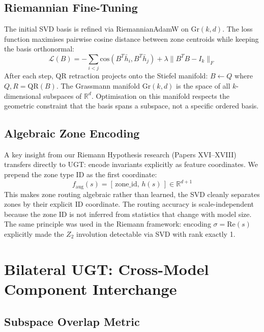 \documentclass[11pt]{article}
\begin{document}
\subsection{Riemannian Fine-Tuning}

The initial SVD basis is refined via RiemannianAdamW on $\mathrm{Gr}(k,d)$. The loss function maximises pairwise cosine distance between zone centroids while keeping the basis orthonormal:
\begin{equation}
\mathcal{L}(B) = -\sum_{i < j} \mathrm{cos}(B^T \bar{h}_i, B^T \bar{h}_j) + \lambda \|B^T B - I_k\|_F
\end{equation}
After each step, QR retraction projects onto the Stiefel manifold: $B \leftarrow Q$ where $Q,R = \mathrm{QR}(B)$. The Grassmann manifold $\mathrm{Gr}(k,d)$ is the space of all $k$-dimensional subspaces of $\mathbb{R}^d$. Optimisation on this manifold respects the geometric constraint that the basis spans a subspace, not a specific ordered basis.

\subsection{Algebraic Zone Encoding}

A key insight from our Riemann Hypothesis research (Papers XVI--XVIII) transfers directly to UGT: encode invariants explicitly as feature coordinates. We prepend the zone type ID as the first coordinate:
\begin{equation}
f_{\mathrm{aug}}(s) = [\, \mathrm{zone\_id},\, h(s) \,] \in \mathbb{R}^{d+1}
\end{equation}
This makes zone routing algebraic rather than learned, the SVD cleanly separates zones by their explicit ID coordinate. The routing accuracy is scale-independent because the zone ID is not inferred from statistics that change with model size. The same principle was used in the Riemann framework: encoding $\sigma = \mathrm{Re}(s)$ explicitly made the $Z_2$ involution detectable via SVD with rank exactly 1.


\section{Bilateral UGT: Cross-Model Component Interchange}

\subsection{Subspace Overlap Metric}
\end{document}
